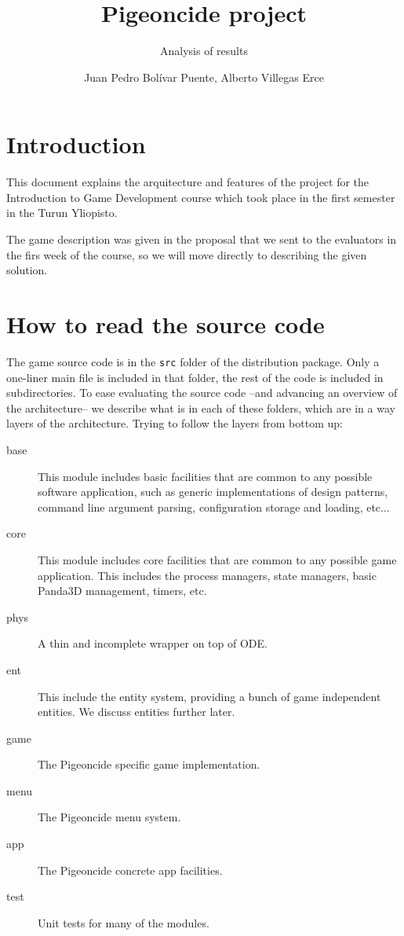 \documentclass[a4paper,10pt]{article}
\title{Pigeoncide project}
\subtitle{Analysis of results}
\author{Juan Pedro Bolívar Puente, Alberto Villegas Erce}
\begin{document}
\raskolnikovmaketitle
\tableofcontents


\section{Introduction}

This document explains the arquitecture and features of the project
for the Introduction to Game Development course which took place in
the first semester in the Turun Yliopisto.

The game description was given in the proposal that we sent to the
evaluators in the firs week of the course, so we will move directly to
describing the given solution.

\section{How to read the source code}

The game source code is in the \texttt{src} folder of the distribution
package. Only a one-liner main file is included in that folder, the
rest of the code is included in subdirectories. To ease evaluating the
source code --and advancing an overview of the architecture-- we
describe what is in each of these folders, which are in a way layers
of the architecture. Trying to follow the layers from bottom up:

\begin{description}
\item[base] This module includes basic facilities that are common to
  any possible software application, such as generic implementations
  of design patterns, command line argument parsing, configuration
  storage and loading, etc...

\item[core] This module includes core facilities that are common to
  any possible game application. This includes the process managers,
  state managers, basic Panda3D management, timers, etc.

\item[phys] A thin and incomplete wrapper on top of ODE.

\item[ent] This include the entity system, providing a bunch of game
  independent entities. We discuss entities further later.

\item[game] The Pigeoncide specific game implementation.

\item[menu] The Pigeoncide menu system.

\item[app] The Pigeoncide concrete app facilities.

\item[test] Unit tests for many of the modules.

\end{description}
\end{document}
